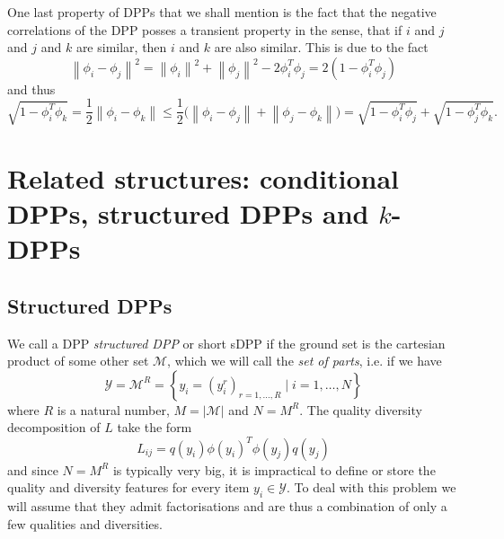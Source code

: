 One last property of DPPs that we shall mention is the fact that the negative correlations of the DPP posses a transient property in the sense, that if \(i\) and \(j\) and \(j\) and \(k\) are similar, then \(i\) and \(k\) are also similar. This is due to the fact
\[\left\lVert \phi_i - \phi_j \right\rVert^2 = \left\lVert \phi_i \right\rVert^2 + \left\lVert \phi_j \right\rVert^2 - 2\phi_i^T\phi_j = 2(1-\phi_i^T\phi_j)\]
and thus
\[\sqrt{1-\phi_i^T\phi_k} = \frac12\left\lVert \phi_i - \phi_k \right\rVert\le\frac12\big(\left\lVert \phi_i - \phi_j \right\rVert + \left\lVert \phi_j - \phi_k \right\rVert\big) = \sqrt{1-\phi_i^T\phi_j} + \sqrt{1-\phi_j^T\phi_k}.\]


\section{Related structures: conditional DPPs, structured DPPs and \(k\)-DPPs}

\subsection*{Structured DPPs}

We call a DPP \emph{structured DPP} or short sDPP if the ground set is the cartesian product of some other set \(\mathcal M\), which we will call the \emph{set of parts}, i.e. if we have
\[\mathcal Y = \mathcal M^R = \left\{ y_i = (y_i^r)_{r = 1, \dots, R} \mid i = 1, \dots, N\right\}\]
where \(R\) is a natural number, \(M = \left\lvert \mathcal M \right\rvert\) and \(N = M^R\). The quality diversity decomposition of \(L\) take the form 
\[L_{ij} = q(y_i) \phi(y_i)^T \phi(y_j) q(y_j)\]
and since \(N = M^R\) is typically very big, it is impractical to define or store the quality and diversity features for every item \(y_i\in\mathcal Y\). To deal with this problem we will assume that they admit factorisations and are thus a combination of only a few qualities and diversities.


